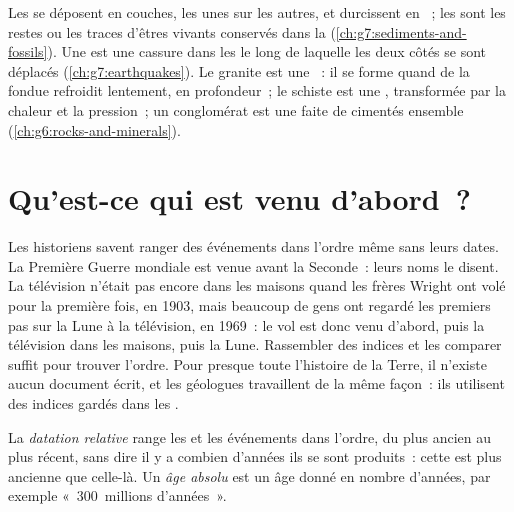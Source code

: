 \begin{recall}
Les  se déposent en couches, les unes sur les autres, et
durcissent en ~; les  sont les restes ou les
traces d'êtres vivants conservés dans la 
(\cref{ch:g7:sediments-and-fossils}). Une \emph{} est une cassure
dans les  le long de laquelle les deux côtés se sont déplacés
(\cref{ch:g7:earthquakes}). Le granite est une \emph{}~: il se
forme quand de la  fondue refroidit lentement, en profondeur~; le
schiste est une \emph{}, transformée par la chaleur et
la pression~; un conglomérat est une  faite de 
cimentés ensemble (\cref{ch:g6:rocks-and-minerals}).
\end{recall}

\section{Qu'est-ce qui est venu d'abord~?}

Les historiens savent ranger des événements dans l'ordre même sans leurs
dates. La Première Guerre mondiale est venue avant la Seconde~: leurs
noms le disent. La télévision n'était pas encore dans les maisons quand les
frères Wright ont volé pour la première fois, en 1903, mais beaucoup de
gens ont regardé les premiers pas sur la Lune à la télévision, en 1969~:
le vol est donc venu d'abord, puis la télévision dans les maisons, puis la
Lune. Rassembler des indices et les comparer suffit pour trouver l'ordre.
Pour presque toute l'histoire de la Terre, il n'existe aucun document
écrit, et les géologues travaillent de la même façon~: ils utilisent des
indices gardés dans les .

\begin{definition}\label{def:g7:geological-time:relative-dating}
La \emph{datation relative} range les  et
les événements dans l'ordre, du plus ancien au plus récent, sans dire il y
a combien d'années ils se sont produits~: cette  est plus ancienne
que celle-là. Un \emph{âge absolu} est un âge
donné en nombre d'années, par exemple «~\num{300}~millions d'années~».
\end{definition}

